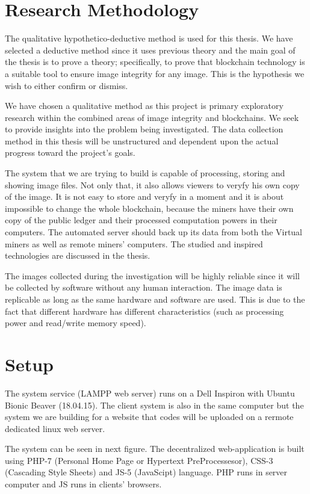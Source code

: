 \section{Research Methodology}
\label{sec:methods}
The qualitative hypothetico-deductive method is used for this thesis. We have selected a deductive method since it uses previous theory and the main goal of the thesis is to prove a theory; specifically, to prove that blockchain technology is a suitable tool to ensure image integrity for any image. This is the hypothesis we wish to either confirm or dismiss.

We have chosen a qualitative method as this project is primary exploratory research within the combined areas of image integrity and blockchains. We seek to provide insights into the problem being investigated. The data collection method in this thesis will be unstructured and dependent upon the actual progress toward the project's goals.

The system that we are trying to build is capable of processing, storing and showing image files. Not only that, it also allows viewers to veryfy his own copy of the image. It is not easy to store and veryfy in a moment and it is about impossible to change the whole blockchain, because the miners have their own copy of the public ledger and their processed computation powers in their computers. The automated server should back up its data from both the Virtual miners as well as remote miners' computers. The studied and inspired technologies are discussed in the thesis.

The images collected during the investigation will be highly reliable since it will be collected by software without any human interaction. The image data is replicable as long as the same hardware and software are used. This is due to the fact that different hardware has different characteristics (such as processing power and read/write memory speed).

\section{Setup}
\label{sec:setup}
The system service (LAMPP web server) runs on a Dell Inspiron with Ubuntu Bionic Beaver (18.04.15). The client system is also in the same computer but the system we are building for a website that codes will be uploaded on a rermote dedicated linux web server.

The system can be seen in next figure. The decentralized web-application is built using PHP-7 (Personal Home Page or Hypertext PreProcessesor), CSS-3 (Cascading Style Sheets) and JS-5 (JavaScipt) language. PHP runs in server computer and JS runs in clients' browsers.

